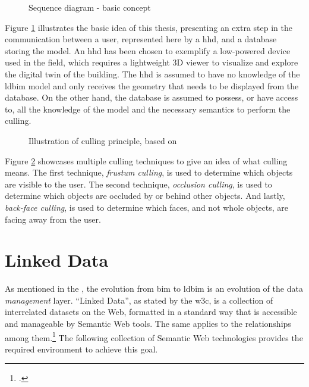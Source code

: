 \begin{figure}[h]
	\centering
	
	\caption{Sequence diagram - basic concept}
	\label{fig:firstIdea}
\end{figure}

Figure \ref{fig:firstIdea} illustrates the basic idea of this thesis, presenting an extra step in the communication between a user, represented here by a \ac{hhd}, and a database storing the model. An \ac{hhd} has been chosen to exemplify a low-powered device used in the field, which requires a lightweight 3D viewer to visualize and explore the digital twin of the building. The \ac{hhd} is assumed to have no knowledge of the \ac{ldbim} model and only receives the geometry that needs to be displayed from the database. On the other hand, the database is assumed to possess, or have access to, all the knowledge of the model and the necessary semantics to perform the culling.

\begin{figure}[h]
	\centering
	
	\caption{Illustration of culling principle, based on \cite{CullingPrinciples}}
	\label{fig:cullingPrinciple}
\end{figure}

Figure \ref{fig:cullingPrinciple} showcases multiple culling techniques to give an idea of what culling means. The first technique, \emph{frustum culling}, is used to determine which objects are visible to the user. The second technique, \emph{occlusion culling}, is used to determine which objects are occluded by or behind other objects. And lastly, \emph{back-face culling}, is used to determine which faces, and not whole objects, are facing away from the user.

\section{Linked Data}

As mentioned in the , the evolution from \ac{bim} to \ac{ldbim} is an evolution of the data \emph{management} layer. \enquote{Linked Data}, as stated by the \ac{w3c}, is a collection of interrelated datasets on the Web, formatted in a standard way that is accessible and manageable by Semantic Web tools. The same applies to the relationships among them.\footcite{w3c} The following collection of Semantic Web technologies provides the required environment to achieve this goal.

